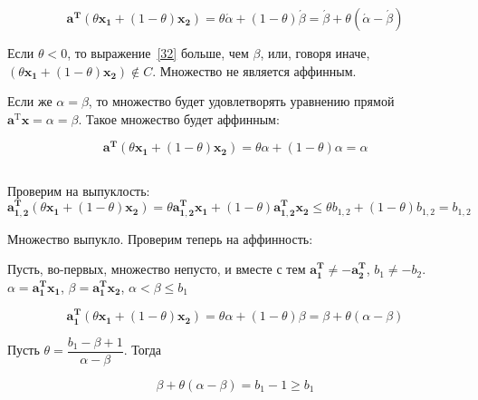 	\begin{equation}
	\label{32}
	\mathbf{a^T} (\theta \mathbf{x_1} + (1 - \theta) \mathbf{x_2}) = \theta \acute{\alpha} + (1-\theta) \acute{\beta} =  \acute{\beta} + \theta (\acute{\alpha} - \acute{\beta})
	\end{equation}
	
	Если $\theta < 0$, то выражение~\eqref{32} больше, чем $\beta$, или, говоря иначе, $(\theta \mathbf{x_1} + (1 - \theta) \mathbf{x_2}) \notin C$. Множество не является аффинным.
	
	Если же $\alpha = \beta$, то множество будет удовлетворять уравнению прямой $\mathbf{a}^\text{T} \mathbf{x} = \alpha = \beta$. Такое множество будет аффинным:
	
	\begin{equation}
		\mathbf{a^T} (\theta \mathbf{x_1} + (1 - \theta) \mathbf{x_2}) = \theta \alpha + (1-\theta) \alpha = \alpha
	\end{equation}
	
	\subsection{}
	
	Проверим на выпуклость:
	\begin{equation}
	\mathbf{a_{1,2}^T} (\theta \mathbf{x_1} + (1 - \theta) \mathbf{x_2}) = \theta
	\mathbf{a_{1,2}^T} \mathbf{x_1} + (1 - \theta) \mathbf{a_{1,2}^T} \mathbf{x_2} \leqslant 
	\theta b_{1,2} + (1 - \theta) b_{1,2} = b_{1,2}
	\end{equation}
	
	Множество выпукло. Проверим теперь на аффинность:
	
	Пусть, во-первых, множество непусто, и вместе с тем $\mathbf{a_1^T} \neq -\mathbf{a_2^T}$, $b_1 \neq -b_2$.$\alpha = \mathbf{a_{1}^T} \mathbf{x_1}$, $\beta  = \mathbf{a_{1}^T} \mathbf{x_2}$,  $\alpha < \beta \leqslant b_1  $
	
	\begin{equation}
	\label{35}
	\mathbf{a_1^T} (\theta \mathbf{x_1} + (1 - \theta) \mathbf{x_2}) = \theta \alpha + (1-\theta) \beta= \beta + \theta(\alpha - \beta)
	\end{equation} 
	
		
	Пусть $\theta = \dfrac{b_1-\beta+1}{\alpha-\beta}$. Тогда
	
	\begin{equation}
	\beta + \theta(\alpha - \beta) = b_1 - 1 \geqslant b_1
	\end{equation}
	
